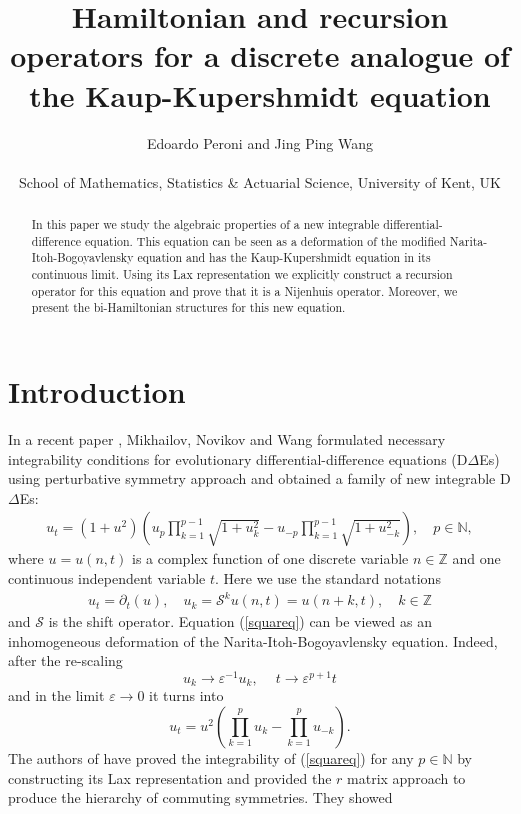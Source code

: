 \documentclass{article}
\title{Hamiltonian and recursion operators for a discrete analogue of the Kaup-Kupershmidt equation}
\author{Edoardo Peroni and
Jing Ping Wang
\\ \\
School of Mathematics, Statistics \& Actuarial Science, University of Kent, UK
}
\date{}
\numberwithin{equation}{section}
\newcommand\cS{{\mathcal S}}
\newcommand{\field}[1]{\mathbb{#1}}
\newcommand{\Z}{\field{Z}}
\begin{document}
	\maketitle
	\begin{abstract}
		In this paper we study the algebraic properties of a new
integrable differential-difference equation. This equation can be seen as a
deformation of
		the modified Narita-Itoh-Bogoyavlensky equation and has the 
Kaup-Kupershmidt equation in its continuous limit.
Using its Lax representation we explicitly construct a recursion operator for this equation
 and prove that it is a Nijenhuis operator. Moreover,
we present the bi-Hamiltonian structures for this new equation.
	\end{abstract}

	\section{Introduction}
In a recent paper \cite{15}, Mikhailov, Novikov and Wang formulated necessary 
integrability conditions for evolutionary differential-difference equations (D$\Delta$Es) using perturbative symmetry approach and 
obtained a family of new integrable D$\Delta$Es:
\begin{eqnarray}\label{squareq}
u_t=(1+u^2)(u_p\prod_{k=1}^{p-1}\sqrt{1+u_k^2}-u_{-p}\prod_{k=1}^{p-1}\sqrt{1+u_
{-k}^2}), \quad  p\in \mathbb{N},
\end{eqnarray}
where $u=u(n,t)$ is a complex function of one discrete variable $n\in\Z$ and one
continuous independent variable $t$. Here
we use the standard notations
\begin{eqnarray*}
 u_t=\partial_t(u), \quad u_k=\cS^k u(n,t)=u(n+k,t), \quad k\in \Z
\end{eqnarray*}
and $\cS$ is the shift operator.
Equation (\ref{squareq}) can be viewed as an inhomogeneous deformation of the 
Narita-Itoh-Bogoyavlensky equation. Indeed, after the re-scaling
\begin{equation}\label{scaling}
u_k\to \varepsilon^{-1} u_k,\quad\ t\to \varepsilon^{p+1}t
\end{equation}
and in the limit $\varepsilon\to
0$ it turns into
\begin{equation}
u_t=u^2(\prod_{k=1}^{p} u_k-\prod_{k=1}^{p} u_{-k})  \label{mNIB}.
\end{equation}
The authors of \cite{15} have proved the integrability of (\ref{squareq}) for any
$p\in \mathbb{N}$ by constructing its Lax representation and provided the $r$
matrix approach to produce the hierarchy of commuting symmetries. They showed 
\end{document}

